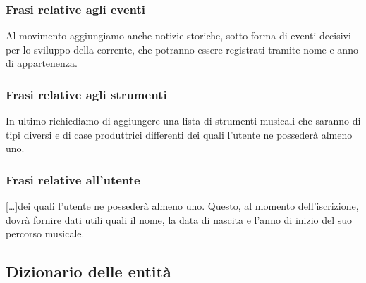 \documentclass{article}
\begin{document}
    \subsubsection{Frasi relative agli eventi}

    Al movimento aggiungiamo anche notizie storiche, sotto forma di eventi decisivi per lo sviluppo della corrente, che potranno essere registrati tramite nome e anno di appartenenza.

    \subsubsection{Frasi relative agli strumenti}

    In ultimo richiediamo di aggiungere una lista di strumenti musicali che saranno di tipi diversi e di case produttrici differenti dei quali l'utente ne possederà almeno uno.

    \subsubsection{Frasi relative all'utente}

    [\dots]dei quali l'utente ne possederà almeno uno. Questo, al
    momento dell'iscrizione, dovrà fornire dati utili quali il nome, la data di nascita e l'anno di inizio del suo percorso musicale.\\

    \subsection{Dizionario delle entità}
\end{document}
